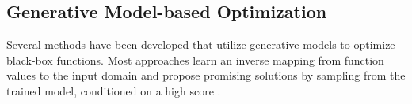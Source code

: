 


\subsection{Generative Model-based Optimization}



Several methods have been developed that utilize generative models to optimize black-box functions. Most approaches learn an inverse mapping from function values to the input domain and propose promising solutions by sampling from the trained model, conditioned on a high score \cite{brookes2019conditioning, kumar2020model, krishnamoorthy2023diffusion, wu2024diff, kim2024bootstrapped}.


